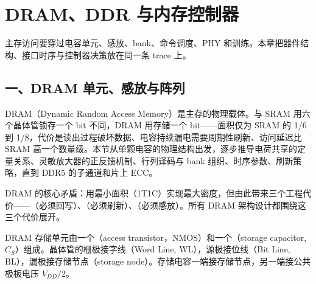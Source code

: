 \chapter{DRAM、DDR 与内存控制器}

\begin{keyidea}
主存访问要穿过电容单元、感放、bank、命令调度、PHY 和训练。本章把器件结构、接口时序与控制器决策放在同一条 trace 上。
\end{keyidea}

\section{一、DRAM 单元、感放与阵列}

DRAM（Dynamic Random Access Memory）是主存的物理载体。与 SRAM 用六个晶体管锁存一个 bit 不同，DRAM 用存储一个 bit——面积仅为 SRAM 的 1/6 到 1/8，代价是读出过程破坏数据、电容持续漏电需要周期性刷新、访问延迟比 SRAM 高一个数量级。本节从单颗电容的物理结构出发，逐步推导电荷共享的定量关系、灵敏放大器的正反馈机制、行列译码与 bank 组织、时序参数、刷新策略，直到 DDR5 的子通道和片上 ECC。

\begin{keyidea}
DRAM 的核心矛盾：用最小面积（1T1C）实现最大密度，但由此带来三个工程代价——（必须回写）、（必须刷新）、（必须感放）。所有 DRAM 架构设计都围绕这三个代价展开。
\end{keyidea}


DRAM 存储单元由一个（access transistor，NMOS）和一个（storage capacitor, $C_S$）组成。晶体管的栅极接字线（Word Line, WL），源极接位线（Bit Line, BL），漏极接存储节点（storage node）。存储电容一端接存储节点，另一端接公共极板电压 $V_{DD}/2$。

